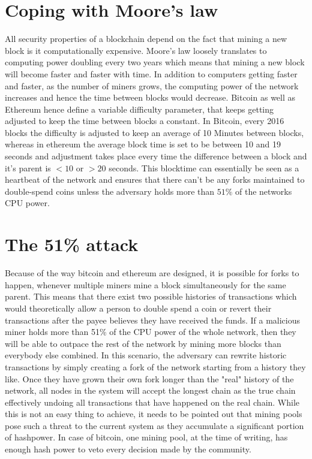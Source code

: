 \documentclass[12pt,msc,a4paper,oneside]{ucl_thesis}
\begin{document}
\section{Coping with Moore's law}
All security properties of a blockchain depend on the fact that mining a new block is it computationally expensive. Moore's law loosely translates to computing power doubling every two years which means that mining a new block will become faster and faster with time. In addition to computers getting faster and faster, as the number of miners grows, the computing power of the network increases and hence the time between blocks would decrease. Bitcoin as well as Ethereum hence define a variable difficulty parameter, that keeps getting adjusted to keep the time between blocks a constant. In Bitcoin, every 2016 blocks the difficulty is adjusted to keep an average of 10 Minutes between blocks\cite{bitcoin_wiki:difficulty}, whereas in ethereum the average block time is set to be between 10 and 19 seconds and adjustment takes place every time the difference between a block and it's parent is $<10$ or $>20$ seconds\cite{ethereum_wiki:homestead}. This blocktime can essentially be seen as a heartbeat of the network and ensures that there can't be any forks maintained to double-spend coins unless the adversary holds more than $51\%$ of the networks CPU power.

\section{The 51\% attack}
Because of the way bitcoin and ethereum are designed, it is possible for forks to happen, whenever multiple miners mine a block simultaneously for the same parent. This means that there exist two possible histories of transactions which would theoretically allow a person to double spend a coin or revert their transactions after the payee believes they have received the funds. If a malicious miner holds more than 51\% of the CPU power of the whole network, then they will be able to outpace the rest of the network by mining more blocks than everybody else combined. In this scenario, the adversary can rewrite historic transactions by simply creating a fork of the network starting from a history they like. Once they have grown their own fork longer than the "real" history of the network, all nodes in the system will accept the longest chain as the true chain effectively undoing all transactions that have happened on the real chain. While this is not an easy thing to achieve, it needs to be pointed out that mining pools pose such a threat to the current system as they accumulate a significant portion of hashpower. In case of bitcoin, one mining pool, at the time of writing, has enough hash power to veto every decision made by the community.
\end{document}
